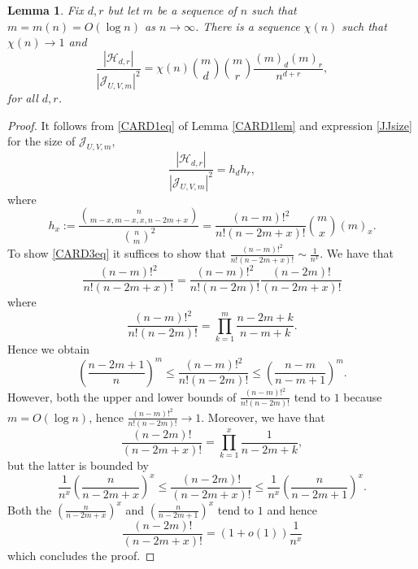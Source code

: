 \documentclass[reqno]{amsart}
\theoremstyle{theorem}
\newtheorem{lemma}[theorem]{Lemma}
\newtheorem{corollary}[theorem]{Corollary}
\theoremstyle{definition}
\theoremstyle{remark}
\def\HH{\mathscr{H}}
\newcommand{\1}{{\text{\Large $\mathfrak 1$}}}	%
\numberwithin{equation}{section}
\def\JJ{\mathscr J}
\begin{document}


\begin{lemma} 
\label{CARD3lem}
Fix $d,r$ but let $m$ be a sequence of $n$ such that
$m=m(n) = O(\log n)$ as $n \to \infty$.
There is a sequence $\chi(n)$ such that $\chi(n) \to 1$ and 
\begin{equation}
\label{CARD3eq}
\frac{|\HH_{d,r}|}{|\JJ_{U,V,m}|^2}
= \chi(n)
\binom{m}{d} \binom{m}{r} \frac{(m)_d (m)_r}{n^{d+r}},
\end{equation}
for all $d, r$.
\end{lemma}

\begin{proof}
It follows from \eqref{CARD1eq} 
of Lemma \ref{CARD1lem} and expression \eqref{JJsize} for the size 
of $\JJ_{U,V,m}$,
\[
\frac{|\HH_{d,r}|}{|\JJ_{U,V,m}|^2} 
= h_d h_r,
\]
where
\[
h_x := \frac{\binom{n}{m-x, m-x, x, n-2m+x}}{\binom{n}{m}^2} 
= \frac{(n-m)!^2}{n! (n-2m+x)!} \binom{m}{x} (m)_x.
\]
To show \eqref{CARD3eq} it suffices to show that 
$\frac{(n-m)!^2}{n! (n-2m+x)!} \sim \frac{1}{n^x}$.
We have that
\[
\frac{(n - m)!^2}{n! (n - 2m + x)!} = \frac{(n - m)!^2}{n! (n - 2m)!}
\frac{(n - 2m)!}{(n - 2m + x)!}
\]
where
\[
\frac{(n - m)!^2}{n! (n - 2m)!} =
\prod_{k=1}^m \frac{n-2m+k}{n-m+k}.
\]
Hence we obtain
\[
\left( \frac{n - 2m + 1}{n} \right)^m \le
\frac{(n - m)!^2}{n! (n - 2m)!} \le
\left( \frac{n - m}{n - m + 1} \right)^m.
\]
However, both the upper and lower bounds of $\frac{(n - m)!^2}{n! (n - 2m)!}$
tend to $1$ because $m = O(\log n)$, hence $\frac{(n - m)!^2}{n! (n - 2m)!}
\rightarrow 1$. Moreover, we have that
\[
\frac{(n - 2m)!}{(n - 2m + x)!} = \prod_{k=1}^x \frac{1}{n - 2m + k},
\]
but the latter is bounded by
\[
\frac{1}{n^x} \left(\frac{n}{n - 2m + x}\right)^x \le \frac{(n - 2m)!}{(n - 2m + x)!} \le
\frac{1}{n^x} \left(\frac{n}{n - 2m + 1}\right)^x.
\]
Both the $\left(\frac{n}{n - 2m + x}\right)^x$ and $\left(\frac{n}{n - 2m + 1}\right)^x$ tend to $1$
and hence
\[
\frac{(n - 2m)!}{(n - 2m + x)!} = (1 + o(1)) \frac{1}{n^x}
\]
which concludes the proof.
\end{proof}
\end{document}
